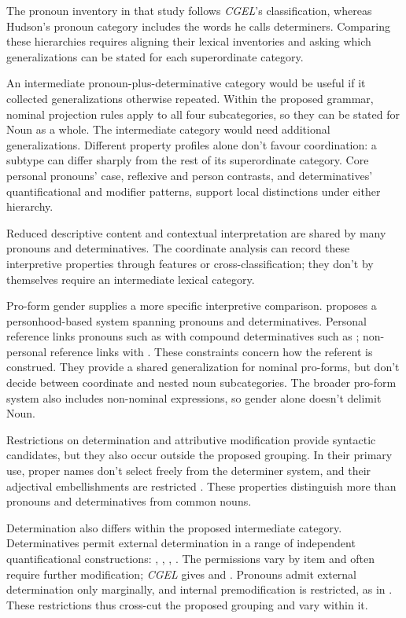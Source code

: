 \documentclass[12pt]{article}
\begin{document}
The pronoun inventory in that study follows \textit{CGEL}'s classification, whereas Hudson's pronoun category includes the words he calls determiners. Comparing these hierarchies requires aligning their lexical inventories and asking which generalizations can be stated for each superordinate category.

An intermediate pronoun-plus-determinative category would be useful if it collected generalizations otherwise repeated. Within the proposed grammar, nominal projection rules apply to all four subcategories, so they can be stated for Noun as a whole. The intermediate category would need additional generalizations. Different property profiles alone don't favour coordination: a subtype can differ sharply from the rest of its superordinate category. Core personal pronouns' case, reflexive and person contrasts, and determinatives' quantificational and modifier patterns, support local distinctions under either hierarchy.

Reduced descriptive content and contextual interpretation are shared by many pronouns and determinatives. The coordinate analysis can record these interpretive properties through features or cross-classification; they don't by themselves require an intermediate lexical category.

Pro-form gender supplies a more specific interpretive comparison. \textcite{reynolds2025proformgender} proposes a personhood-based system spanning pronouns and determinatives. Personal reference links pronouns such as  with compound determinatives such as ; non-personal reference links  with . These constraints concern how the referent is construed. They provide a shared generalization for nominal pro-forms, but don't decide between coordinate and nested noun subcategories. The broader pro-form system also includes non-nominal expressions, so gender alone doesn't delimit Noun.

Restrictions on determination and attributive modification provide syntactic candidates, but they also occur outside the proposed grouping. In their primary use, proper names don't select freely from the determiner system, and their adjectival embellishments are restricted \citep[517, 519--520]{huddleston2002}. These properties distinguish more than pronouns and determinatives from common nouns.

Determination also differs within the proposed intermediate category. Determinatives permit external determination in a range of independent quantificational constructions: , , , . The permissions vary by item and often require further modification; \textit{CGEL} gives  and  \citep[415--416]{huddleston2002}. Pronouns admit external determination only marginally, and internal premodification is restricted, as in  \citep[429--430]{huddleston2002}. These restrictions thus cross-cut the proposed grouping and vary within it.
\end{document}
